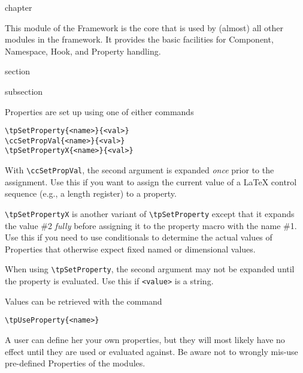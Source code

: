 \begin{heading}[label=chap:common]{chapter}
\end{heading}

This module of the {\CoCoTeX} Framework is the core
that is used by (almost) all other modules in the framework. It
provides the basic facilities for Component, Namespace, Hook, and
Property handling.

\begin{heading}[label=sec:use_props]{section}
\end{heading}

\begin{heading}[label=sec:set_props]{subsection}
\end{heading}

Properties are set up using one of either commands
\begin{lstlisting}[style=tex]
\tpSetProperty{<name>}{<val>}
\ccSetPropVal{<name>}{<val>}
\tpSetPropertyX{<name>}{<val>}
\end{lstlisting}
With
\lstinline{\ccSetPropVal}, the second argument is expanded \textit{once}
prior to the assignment. Use this if you want to assign the current
value of a {\LaTeX} control sequence (e.g., a length register) to a
property.

\lstinline{\tpSetPropertyX} is another variant of \lstinline{\tpSetProperty}
except that it expands the value \#2 \textit{fully} before assigning
it to the property macro with the name \#1.  Use this if you need to
use conditionals to determine the actual values of Properties that
otherwise expect fixed named or dimensional values.


When using \lstinline{\tpSetProperty}, the second argument may not be
expanded until the property is evaluated. Use this if
\lstinline{<value>} is a string.

Values can be retrieved with the command
\begin{lstlisting}[style=tex]
\tpUseProperty{<name>}
\end{lstlisting}

A user can define her your own properties, but they will most likely
have no effect until they are used or evaluated against. Be aware not
to wrongly mis-use pre-defined Properties of the {\CoCoTeX}
modules.

